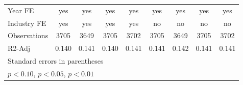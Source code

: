 {\begin{tabular}{l*{8}{c}}
\hline
Year FE             &         yes         &         yes         &         yes         &         yes         &         yes         &         yes         &         yes         &         yes         \\
Industry FE         &         yes         &         yes         &         yes         &         yes         &          no         &          no         &          no         &          no         \\
Observations        &        3705         &        3649         &        3705         &        3702         &        3705         &        3649         &        3705         &        3702         \\
R2-Adj              &       0.140         &       0.141         &       0.140         &       0.141         &       0.141         &       0.142         &       0.141         &       0.141         \\
\hline\hline
\multicolumn{9}{l}{\footnotesize Standard errors in parentheses}\\
\multicolumn{9}{l}{\footnotesize \sym{*} \(p<0.10\), \sym{**} \(p<0.05\), \sym{***} \(p<0.01\)}\\
\end{tabular}
}
